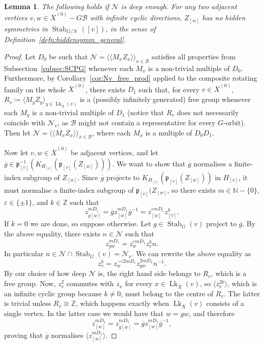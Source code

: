 \documentclass[svgnames]{amsart}
\theoremstyle{plain}
\newtheorem{lemma}[thm]{Lemma}
\theoremstyle{definition}
\newcommand{\Z}{\mathbb{Z}}
\newcommand{\ov}[1]{\overline{#1}}
\newcommand{\link}{\operatorname{Lk}}
\newcommand{\Stab}[2]{\operatorname{Stab}_{#1}(#2)}
\newcommand{\N}{\mathcal{N}}
\newcommand{\B}{\mathcal{B}}
\newcommand{\p}{\mathfrak{p}}
\begin{document}
\begin{lemma}\label{lem:nohidden_for_quot}
	The following holds if $\N$ is deep enough. For any two adjacent vertices $v,w\in \ov X^{(0)}-G\B$ with infinite cyclic directions, $Z_{[w]}$ has no hidden symmetries in $\Stab{G/\N}{[v]}$, in the sense of Definition~\ref{defn:hiddensymm_general}.
\end{lemma}

\begin{proof}
Let $D_0$ be such that $\N=\langle \langle M_xZ_x\rangle\rangle_{x\in \B}$ satisfies all properties from Subsection~\ref{subsec:SCPG} whenever each $M_x$ is a non-trivial multiple of $D_0$. Furthermore, by Corollary~\ref{cor:Nv_free_prod} applied to the composite rotating family on the whole $\ov X^{(0)}$, there exists $D_1$ such that, for every $v\in \ov X^{(0)}$, $R_v\coloneq\langle M_yZ_y\rangle_{y\in \link_{\ov X}(v)}$ is a (possibly infinitely generated) free group whenever each $M_y$ is a non-trivial multiple of $D_1$ (notice that $R_v$ does not necessarily coincide with $\N_v$, as $\B$ might not contain a representative for every $G$-orbit). Then let $\N=\langle \langle M_xZ_x\rangle\rangle_{x\in \B}$, where each $M_x$ is a multiple of $D_0D_1$. 

Now let $v,w\in \ov X^{(0)}$ be adjacent vertices, and let $\ov g\in \p_{[v]}^{-1}\left(K_{H_{[v]}}(\p_{[v]}(Z_{[w]}))\right)$. We want to show that $\ov g$ normalises a finite-index subgroup of $Z_{[w]}$. Since $\ov g$ projects to $K_{H_{[v]}}(\p_{[v]}(Z_{[w]}))$ in $H_{[v]}$, it must normalise a finite-index subgroup of $\p_{[v]}(Z_{[w]}$, so there exists $m\in \mathbb N-\{0\}$, $\varepsilon\in\{\pm 1\}$, and $k\in \mathbb Z$ such that
$$z_{\ov g[w]}^{mD_1}=\ov gz_{[w]}^{mD_1}\ov g^{-1}=z_{[w]}^{\varepsilon mD_1}z_{[v]}^k.$$
If $k=0$ we are done, so suppose otherwise. Let $g\in \Stab{G}{v}$ project to $\ov g$. By the above equality, there exists $n\in \N$ such that
$$z_{gw}^{mD_1}=z_{w}^{\varepsilon mD_1}z_{v}^k n.$$
In particular $n\in \N\cap \Stab{G}{v}=\N_v$. We can rewrite the above equality as
$$z_v^k=z_{w}^{-\varepsilon 2mD_1}z_{gw}^{2mD_1}n^{-1}.$$
By our choice of how deep $\N$ is, the right hand side belongs to $R_v$, which is a free group. Now, $z_v^2$ commutes with $z_x$ for every $x\in \link_{\ov X}(v)$, so $\langle z_v^{2k}\rangle$, which is an infinite cyclic group because $k\neq 0$, must belong to the centre of $R_v$. The latter is trivial unless $R_v\cong \Z$, which happens exactly when $\link_{\ov X}(v)$ consists of a single vertex. In the latter case we would have that $w=gw$, and therefore
$$z_{[w]}^{mD_1}=z_{\ov g[w]}^{mD_1}=\ov gz_{[w]}^{mD_1}\ov g^{-1},$$
proving that $\ov g$ normalises $\langle z_{[w]}^{mD_1}\rangle$.
\end{proof}
\end{document}
